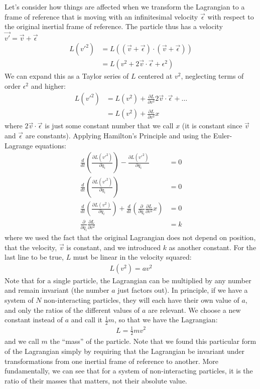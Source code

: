 Let's consider how things are affected when we transform the Lagrangian to a frame of reference that is moving with an infinitesimal velocity $\vec{\epsilon}$ with respect to the original inertial frame of reference. The particle thus has a velocity $\vec{v'}=\vec{v}+\vec{\epsilon}$
\begin{align}
L(v'^2)&=L((\vec{v}+\vec{\epsilon})\cdot(\vec{v}+\vec{\epsilon}))\nonumber\\
&=L(v^2+2\vec{v}\cdot\vec{\epsilon}+\epsilon^2)
\end{align}
We can expand this as a Taylor series of $L$ centered at $v^2$, neglecting terms of order $\epsilon^2$ and higher:
\begin{align}
L(v'^2)&=L(v^2)+\frac{\partial L}{\partial v^2}2\vec{v}\cdot\vec{\epsilon}+\dots\nonumber\\
&=L(v^2)+\frac{\partial L}{\partial v^2}x
\end{align}
where $2\vec{v}\cdot\vec{\epsilon}$ is just some constant number that we call $x$ (it is constant since $\vec{v}$ and $\vec{\epsilon}$ are constants). Applying Hamilton's Principle and using the Euler-Lagrange equations:
\begin{align}
\frac{d}{dt}\left(\frac{\partial L(v'^2)}{\partial \dot{q}_i} \right) - \frac{\partial L(v'^2)}{\partial q_i}&=0\nonumber\\
\frac{d}{dt}\left(\frac{\partial L(v'^2)}{\partial \dot{q}_i} \right)&=0\nonumber\\
\frac{d}{dt}\left(\frac{\partial L(v^2)}{\partial \dot{q}_i} \right)+\frac{d}{dt}\left(\frac{\partial}{\partial \dot{q}_i}\frac{\partial L}{\partial v^2}x \right)&=0\nonumber\\
\frac{\partial}{\partial \dot{q}_i}\frac{\partial L}{\partial v^2}&=k
\end{align}
where we used the fact that the original Lagrangian does not depend on position, that the velocity, $\vec{v}$ is constant, and we introduced $k$ as another constant. For the last line to be true, $L$ must be linear in the velocity squared:
\begin{align}
L(v^2)=av^2
\end{align}
Note that for a single particle, the Lagrangian can be multiplied by any number and remain invariant (the number $a$ just factors out). In principle, if we have a system of $N$ non-interacting particles, they will each have their own value of $a$, and only the ratios of the different values of $a$ are relevant. 
We choose a new constant instead of $a$ and call it $\frac{1}{2}m$, so that we have the Lagrangian:
\begin{align}
L=\frac{1}{2}mv^2
\end{align}
and we call $m$ the ``mass'' of the particle. Note that we found this particular form of the Lagrangian simply by requiring that the Lagrangian be invariant under transformations from one inertial frame of reference to another. More fundamentally, we can see that for a system of non-interacting particles, it is the ratio of their masses that matters, not their absolute value.

